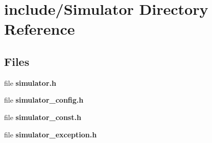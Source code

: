 \section{include/\+Simulator Directory Reference}
\label{dir_33e04a8098dc3fe87f81eb223d56b845}
\subsection*{Files}
\begin{DoxyCompactItemize}
\item 
file {\bfseries simulator.\+h}
\item 
file {\bfseries simulator\+\_\+config.\+h}
\item 
file {\bfseries simulator\+\_\+const.\+h}
\item 
file {\bfseries simulator\+\_\+exception.\+h}
\end{DoxyCompactItemize}
